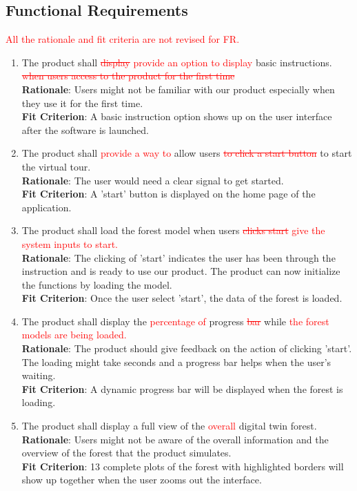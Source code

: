 \documentclass{article}
\begin{document}
\subsection{Functional Requirements}
\textcolor{red}{All the rationale and fit criteria are not revised for FR.}
\begin{enumerate}[FR1]
	\item The product shall \textcolor{red}{\st{display} provide an option to display} basic
	 instructions. \textcolor{red}{\st{when users access to the product for the first time}}\\
	\textbf{Rationale}: Users might not be familiar with our product especially when they use 
	it for the first time.\\
	\textbf{Fit Criterion}: A basic instruction 
	option shows up on the user interface after the software is launched. 
	
	\item The product shall \textcolor{red}{provide a way to} allow users \textcolor{red}{\st{to click
	 a start button}} to start the virtual tour.\\
	\textbf{Rationale}: The user would need a clear signal to get started.\\
	\textbf{Fit Criterion}: A 'start' button is displayed on the home page of the application.
	
	\item The product shall load the forest model when users \textcolor{red}{\st{clicks start} give
	the system inputs to start.}\\
	\textbf{Rationale}: The clicking of 'start' indicates the user has been through the instruction and is ready to use our product. The product can now initialize the functions by loading the model.\\
	\textbf{Fit Criterion}: Once the user select 'start', the data of the forest is loaded.
	
	\item The product shall display the \textcolor{red}{percentage of }progress \textcolor{red}{\st{bar}} while \textcolor{red}
	 {the forest models are being loaded.} \\
	\textbf{Rationale}: The product should give feedback on the action of clicking 'start'. The loading might take seconds and a progress bar helps when the user's waiting. \\
	\textbf{Fit Criterion}: A dynamic progress bar will be displayed when the forest is loading.
	
	\item The product shall display a full view of the \textcolor{red}{overall} digital twin
	forest.\\
	\textbf{Rationale}: Users might not be aware of the overall information and the overview of the forest that the product simulates.\\
	\textbf{Fit Criterion}: 13 complete plots of the forest with highlighted borders will show up together when the user zooms out the interface.
    

\end{enumerate}
\end{document}
